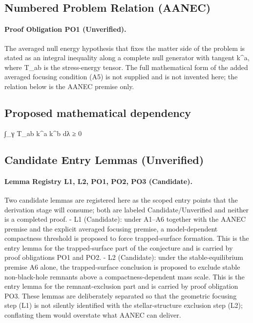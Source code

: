 \documentclass[conference]{IEEEtran}
\begin{document}
\subsection{Numbered Problem Relation (AANEC)}
\paragraph{Proof Obligation PO1 (Unverified).} The averaged null energy hypothesis that fixes the matter side of the problem is stated as an integral inequality along a complete null generator with tangent k\textasciicircum{}a, where T\_ab is the stress-energy tensor. The full mathematical form of the added averaged focusing condition (A5) is not supplied and is not invented here; the relation below is the AANEC premise only.~\cite{cite_0ed84243cf171bc4}

\subsection{Proposed mathematical dependency}
∫\_γ T\_ab k\textasciicircum{}a k\textasciicircum{}b dλ ≥ 0~\cite{cite_0ed84243cf171bc4}

\subsection{Candidate Entry Lemmas (Unverified)}
\paragraph{Lemma Registry L1, L2, PO1, PO2, PO3 (Candidate).} Two candidate lemmas are registered here as the scoped entry points that the derivation stage will consume; both are labeled Candidate/Unverified and neither is a completed proof. - L1 (Candidate): under A1–A6 together with the AANEC premise and the explicit averaged focusing premise, a model-dependent compactness threshold is proposed to force trapped-surface formation. This is the entry lemma for the trapped-surface part of the conjecture and is carried by proof obligations PO1 and PO2. - L2 (Candidate): under the stable-equilibrium premise A6 alone, the trapped-surface conclusion is proposed to exclude stable non-black-hole remnants above a compactness-dependent mass scale. This is the entry lemma for the remnant-exclusion part and is carried by proof obligation PO3. These lemmas are deliberately separated so that the geometric focusing step (L1) is not silently identified with the stellar-structure exclusion step (L2); conflating them would overstate what AANEC can deliver.
\end{document}
